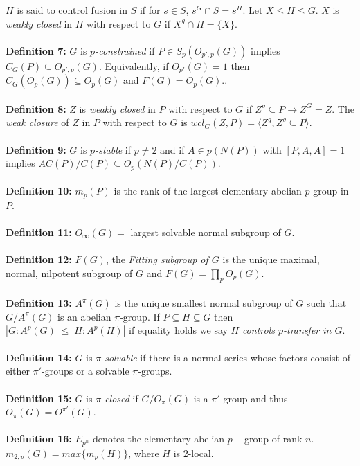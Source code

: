 $H$ is said to
control fusion in $S$ if for $s \in S$, $s^G \cap S = s^H$.
Let $X \le H \le G$.  $X$ is \emph{weakly closed} in $H$ with respect to $G$ if
$X^g \cap H = \{X\}$.\\
\\
{\bf Definition 7:}
$G$ is $p$\emph{-constrained} if
$P \in S_p ( O_{p',p} (G))$ implies $C_G(P) \subseteq O_{p',p} (G)$.
Equivalently, if $O_{p'}(G)=1$ then $C_G(O_p(G)) \subseteq O_p(G)$ and $F(G)= O_p(G)$..
\\
\\
{\bf Definition 8:}
$Z$ is \emph {weakly closed} in $P$ with respect to $G$ if $Z^g \subseteq P \rightarrow Z^G=Z$.
The \emph {weak closure} of $Z$ in $P$ with respect to $G$ is $wcl_G(Z, P)=
\langle Z^g, Z^g \subseteq P \rangle $.
\\
\\
{\bf Definition 9:}
$G$ is $p$\emph{-stable} if $p \ne 2$ and
if $A \in p(N(P))$ with $[P,A,A]= 1$ implies $A C(P)/C(P) \subseteq O_p (N(P)/C(P))$.
\\
\\
{\bf Definition 10:}
$m_p(P)$ is the rank of the largest elementary abelian $p$-group in $P$.
\\
\\
{\bf Definition 11:}
$O_{\infty}(G)=$ largest solvable normal subgroup of $G$.
\\
\\
{\bf Definition 12:} $F(G)$, the \emph{Fitting subgroup of $G$}
is the unique maximal, normal, nilpotent subgroup of $G$ and
$F(G)= \prod_p O_p(G)$.
\\
\\
{\bf Definition 13:} $A^{\pi}(G)$ is the unique smallest normal subgroup of $G$ such that
$G/A^{\pi}(G)$ is an abelian $\pi$-group.  If $P \subseteq H \subseteq G$ then
$ |G:A^p(G)| \le |H:A^p(H)|$ if equality holds we say $H$ \emph {controls $p$-transfer in $G$}.
\\
\\
{\bf Definition 14:}
$G$  is
$\pi$\emph{-solvable} if there is a normal series whose factors
consist of either $\pi'$-groups or a solvable
$\pi$-groups.
\\
\\
{\bf Definition 15:} $G$ is $\pi$\emph{-closed} if $G/O_{\pi}(G)$ is a $\pi'$ group and thus
$O_{\pi}(G)=O^{\pi'}(G)$.
\\
\\
{\bf Definition 16:}
$E_{p^n}$ denotes the elementary abelian $p-$group of rank $n$.
$m_{2,p}(G) = max \{ m_p (H) \}$, where $H$ is 2-local.

